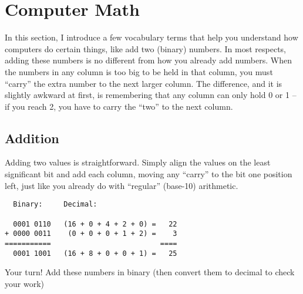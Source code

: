 \section{Computer Math}

In this section, I introduce a few vocabulary terms that help you understand how computers do certain things, like add two (binary) numbers. In most respects, adding these numbers is no different from how you already add numbers. When the numbers in any column is too big to be held in that column, you must ``carry'' the extra number to the next larger column. The difference, and it is slightly awkward at first, is remembering that any column can only hold 0 or 1 -- if you reach 2, you have to carry the ``two'' to the next column.

\subsection*{Addition}

Adding two values is straightforward. Simply align the values on the least significant bit and add each column, moving any ``carry'' to the bit one position left, just like you already do with ``regular'' (base-10) arithmetic.

\begin{verbatim}
  Binary:     Decimal:

  0001 0110   (16 + 0 + 4 + 2 + 0) =   22
+ 0000 0011    (0 + 0 + 0 + 1 + 2) =    3
===========                          ====
  0001 1001   (16 + 8 + 0 + 0 + 1) =   25
\end{verbatim}


\bigskip

\noindent Your turn! Add these numbers in binary (then convert them to decimal to check your work)

\bigskip


